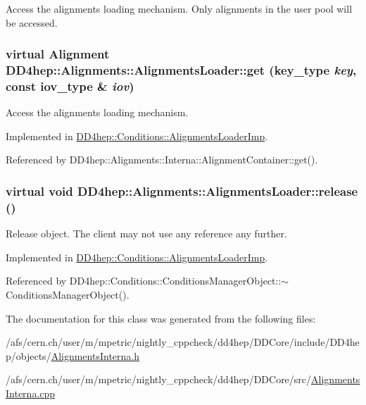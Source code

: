 Access the alignments loading mechanism. Only alignments in the user pool will be accessed. \hypertarget{class_d_d4hep_1_1_alignments_1_1_alignments_loader_a26866df09d8670f134fc0895444f1675}{
\subsubsection[{get}]{\setlength{\rightskip}{0pt plus 5cm}virtual {\bf Alignment} DD4hep::Alignments::AlignmentsLoader::get ({\bf key\_\-type} {\em key}, \/  const {\bf iov\_\-type} \& {\em iov})}}
\label{class_d_d4hep_1_1_alignments_1_1_alignments_loader_a26866df09d8670f134fc0895444f1675}


Access the alignments loading mechanism. 

Implemented in \hyperlink{class_d_d4hep_1_1_conditions_1_1_alignments_loader_imp_af6db86883e1ab8af6940e3260369228d}{DD4hep::Conditions::AlignmentsLoaderImp}.

Referenced by DD4hep::Alignments::Interna::AlignmentContainer::get().\hypertarget{class_d_d4hep_1_1_alignments_1_1_alignments_loader_acebda57b7dc5288116e7162dda92b65e}{
\subsubsection[{release}]{\setlength{\rightskip}{0pt plus 5cm}virtual void DD4hep::Alignments::AlignmentsLoader::release ()}}
\label{class_d_d4hep_1_1_alignments_1_1_alignments_loader_acebda57b7dc5288116e7162dda92b65e}


Release object. The client may not use any reference any further. 

Implemented in \hyperlink{class_d_d4hep_1_1_conditions_1_1_alignments_loader_imp_aa9cf749689a76b853f7d7e543f84b761}{DD4hep::Conditions::AlignmentsLoaderImp}.

Referenced by DD4hep::Conditions::ConditionsManagerObject::$\sim$ConditionsManagerObject().

The documentation for this class was generated from the following files:\begin{DoxyCompactItemize}
\item 
/afs/cern.ch/user/m/mpetric/nightly\_\-cppcheck/dd4hep/DDCore/include/DD4hep/objects/\hyperlink{_alignments_interna_8h}{AlignmentsInterna.h}\item 
/afs/cern.ch/user/m/mpetric/nightly\_\-cppcheck/dd4hep/DDCore/src/\hyperlink{_alignments_interna_8cpp}{AlignmentsInterna.cpp}\end{DoxyCompactItemize}

